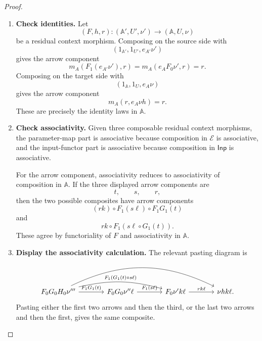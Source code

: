 \begin{proof}
    \leavevmode
    \begin{enumerate}
        \item \textbf{Check identities.}
        Let
        \[
            (F,h,r):
            (\mathbb A',U',\nu')
            \to
            (\mathbb A,U,\nu)
        \]
        be a residual context morphism. Composing on the source side with
        \[
            (1_{\mathbb A'},1_{U'},e_{A'}\nu')
        \]
        gives the arrow component
        \[
            m_A(F_1(e_{A'}\nu'),r)
            =
            m_A(e_A F_0\nu',r)
            =
            r.
        \]
        Composing on the target side with
        \[
            (1_{\mathbb A},1_U,e_A\nu)
        \]
        gives the arrow component
        \[
            m_A(r,e_A\nu h)=r.
        \]
        These are precisely the identity laws in \(\mathbb A\).

        \item \textbf{Check associativity.}
        Given three composable residual context morphisms, the parameter-map
        part is associative because composition in \(\mathcal E\) is
        associative, and the input-functor part is associative because
        composition in \(\mathsf{Inp}\) is associative.

        For the arrow component, associativity reduces to associativity of
        composition in \(\mathbb A\). If the three displayed arrow components
        are
        \[
            t,\qquad s,\qquad r,
        \]
        then the two possible composites have arrow components
        \[
            (rk)\circ F_1(s\ell)\circ F_1G_1(t)
        \]
        and
        \[
            rk\circ F_1(s\ell\circ G_1(t)).
        \]
        These agree by functoriality of \(F\) and associativity in
        \(\mathbb A\).

        \item \textbf{Display the associativity calculation.}
        The relevant pasting diagram is
        \[
        \begin{tikzcd}[column sep=large, row sep=large]
            F_0G_0H_0\nu'''
                \arrow[r, "{F_1G_1(t)}"]
                \arrow[rr, bend left=14, "{F_1(G_1(t)\circ s\ell)}"]
                \arrow[rrr, bend left=26]
            &
            F_0G_0\nu''\ell
                \arrow[r, "{F_1(s\ell)}"]
            &
            F_0\nu'k\ell
                \arrow[r, "{rk\ell}"]
            &
            \nu hk\ell .
        \end{tikzcd}
        \]
        Pasting either the first two arrows and then the third, or the last two
        arrows and then the first, gives the same composite.
    \end{enumerate}
\end{proof}

